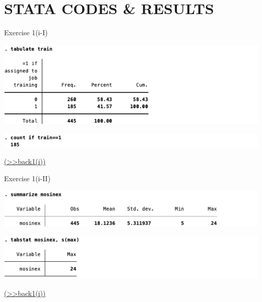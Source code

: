 \documentclass[
  10pt,
  ignorenonframetext,
]{beamer}
\begin{document}
\hypertarget{stata-codes-results}{%
\section{STATA CODES \& RESULTS}\label{stata-codes-results}}

\begin{frame}{Exercise 1(i-I)}
\protect\hypertarget{numtrain}{}
\begin{center}\includegraphics[width=0.9\linewidth]{pictures/numtrain1} \end{center}

\begin{center}\includegraphics[width=0.9\linewidth]{pictures/numtrain2} \end{center}

\footnotesize \protect\hyperlink{1-i}{(\textgreater\textgreater back1(i))}
\normalsize
\end{frame}

\begin{frame}{Exercise 1(i-II)}
\protect\hypertarget{monsinexmax}{}
\begin{center}\includegraphics[width=0.9\linewidth]{pictures/mosinex_max1} \end{center}

\begin{center}\includegraphics[width=0.9\linewidth]{pictures/mosinex_max2} \end{center}

\footnotesize \protect\hyperlink{1-i}{(\textgreater\textgreater back1(i))}
\normalsize
\end{frame}
\end{document}
